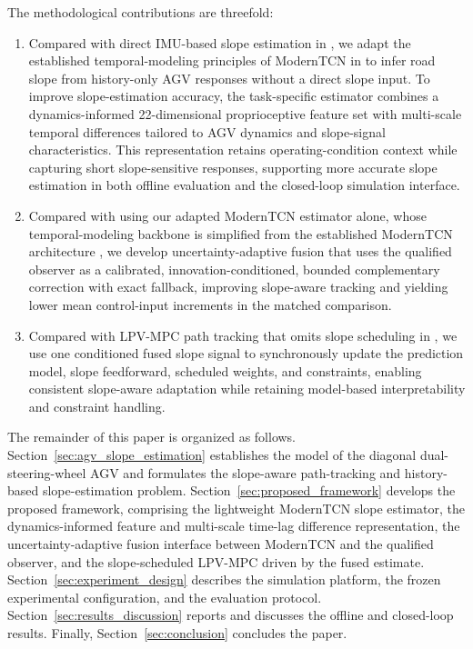 \documentclass{ieeeaccess}
\newcommand{\citep}[1]{\cite{#1}}
\begin{document}
The methodological contributions are threefold:
\begin{enumerate}
\item Compared with direct IMU-based slope estimation in
\citep{Jauch2018IMUGradeOrientation,Li2022QuaternionUKFGrade,
Kim2023InertialRoadPitch}, we adapt the established temporal-modeling
principles of ModernTCN in \citep{Luo2024ModernTCN} to infer road slope
from history-only AGV responses without a direct slope input. To
improve slope-estimation accuracy, the task-specific estimator combines
a dynamics-informed 22-dimensional proprioceptive feature set with
multi-scale temporal differences tailored to AGV dynamics and
slope-signal characteristics. This representation retains
operating-condition context while capturing short slope-sensitive
responses, supporting more accurate slope estimation in both offline
evaluation and the closed-loop simulation interface.
	\item Compared with using our adapted ModernTCN estimator alone, whose
	temporal-modeling backbone is simplified from the established ModernTCN
	architecture \citep{Luo2024ModernTCN}, we develop uncertainty-adaptive fusion
	that uses the qualified observer as a calibrated, innovation-conditioned,
	bounded complementary correction with exact fallback, improving slope-aware
	tracking and yielding lower mean control-input increments in the matched
	comparison.

\item Compared with LPV-MPC path tracking that omits slope scheduling in
\citep{Alcala2020AutonomousRacingLPVMPC,
Tian2022GainScheduledLPVMPC,Cheng2021VelocityVaryingMPC}, we use one
conditioned fused slope signal to synchronously update the prediction
model, slope feedforward, scheduled
weights, and constraints, enabling consistent slope-aware adaptation
while retaining model-based interpretability and constraint handling.
\end{enumerate}

The remainder of this paper is organized as follows.
Section~\ref{sec:agv_slope_estimation} establishes the model of the diagonal
dual-steering-wheel AGV and formulates the slope-aware path-tracking and
history-based slope-estimation problem.
Section~\ref{sec:proposed_framework} develops the proposed framework,
comprising the lightweight ModernTCN slope estimator, the dynamics-informed
feature and multi-scale time-lag difference representation, the uncertainty-adaptive
fusion interface between ModernTCN and the qualified observer, and the slope-scheduled LPV-MPC driven by the fused estimate.
Section~\ref{sec:experiment_design} describes the simulation platform, the
frozen experimental configuration, and the evaluation protocol.
Section~\ref{sec:results_discussion} reports and discusses the offline and
closed-loop results. Finally, Section~\ref{sec:conclusion} concludes the
paper.
\end{document}
